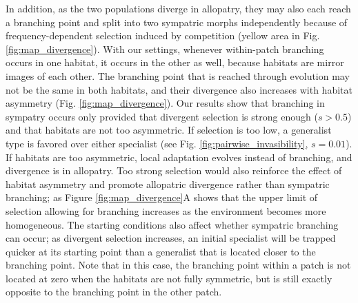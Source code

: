 In addition, as the two populations diverge in allopatry, they may also each reach a branching point and split into two sympatric morphs independently because of frequency-dependent selection induced by competition (yellow area in Fig. \ref{fig:map_divergence}). With our settings, whenever within-patch branching occurs in one habitat, it occurs in the other as well, because habitats are mirror images of each other. The branching point that is reached through evolution may not be the same in both habitats, and their divergence also increases with habitat asymmetry (Fig. \ref{fig:map_divergence}). Our results show that branching in sympatry occurs only provided that divergent selection is strong enough ($s > 0.5$) and that habitats are not too asymmetric. If selection is too low, a generalist type is favored over either specialist (see Fig. \ref{fig:pairwise_invasibility}, $s = 0.01$). If habitats are too asymmetric, local adaptation evolves instead of branching, and divergence is in allopatry. Too strong selection would also reinforce the effect of habitat asymmetry and promote allopatric divergence rather than sympatric branching; as Figure \ref{fig:map_divergence}A shows that the upper limit of selection allowing for branching increases as the environment becomes more homogeneous. The starting conditions also affect whether sympatric branching can occur; as divergent selection increases, an initial specialist will be trapped quicker at its starting point than a generalist that is located closer to the branching point. Note that in this case, the branching point within a patch is not located at zero when the habitats are not fully symmetric, but is still exactly opposite to the branching point in the other patch.


